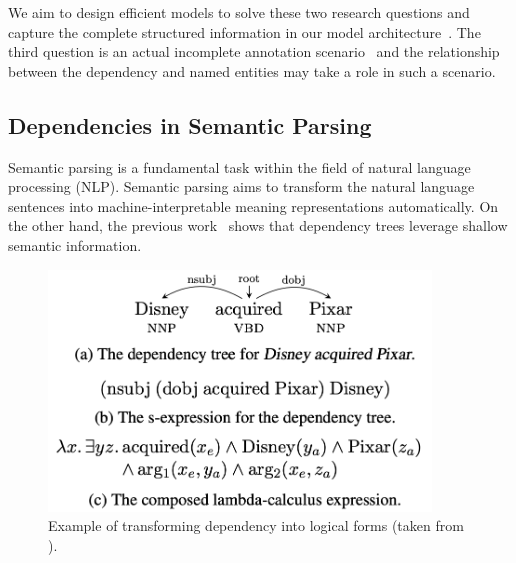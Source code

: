 We aim to design efficient models to solve these two research questions and capture the complete structured information in our model architecture~\cite{jie2017efficient,jie2019dependency}. 
The third question is an actual incomplete annotation scenario~\cite{jie2019better} and the relationship between the dependency and named entities may take a role in such a scenario. 

\subsection{Dependencies in Semantic Parsing}
Semantic parsing is a fundamental task within the field of natural language processing (NLP).
Semantic parsing aims to transform the natural language sentences into machine-interpretable meaning representations automatically. 
On the other hand, the previous work~\cite{reddy2016transforming} shows that dependency trees leverage shallow semantic information. 

\begin{figure}[h!]
	\centering
	\includegraphics[width=4in]{Figures/dep2lambda.png}
	\caption{Example of transforming dependency into logical forms (taken from \citet{reddy2016transforming}).}
	\label{fig:transformexample}
\end{figure}

